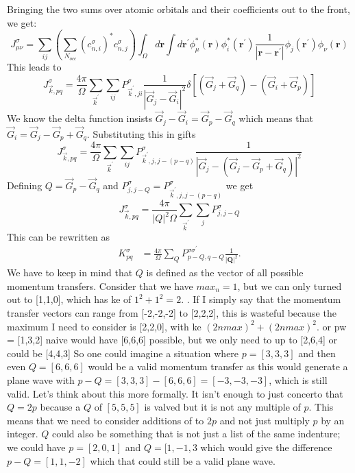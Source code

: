 \documentclass[12pt]{article}
\begin{document}
Bringing the two sums over atomic orbitals and their coefficients out to the front, we get:
\begin{equation}
    J^{\sigma }_{\mu\nu} = \sum_{ij} \left( \sum_{N_{occ}} \left( c^{\sigma }_{n,i} \right)^{*} c^{\sigma }_{n,j} \right) \int_{\Omega } d\mathbf{r} \int d\mathbf{r}^{\prime} \phi^*_\mu(\mathbf{r}) \phi^*_i(\mathbf{r}^{\prime}) \frac{1}{\left|\mathbf{r} - \mathbf{r}^{\prime}\right|} \phi_j(\mathbf{r}^{\prime}) \phi_\nu(\mathbf{r})
\end{equation}
This leads to
\begin{equation}
J_{\vec{k}, p q}^\sigma=\frac{4 \pi}{\Omega} \sum_{\vec{k}^{\prime}} \sum_{i j} P_{\vec{k}^{\prime}, j i}^\sigma \frac{1}{\left|\vec{G}_j-\vec{G}_i\right|^2} \delta\left[\left(\vec{G}_j+\vec{G}_q\right)-\left(\vec{G}_i+\vec{G}_p\right)\right]
\end{equation}
We know the delta function insists $\vec{G}_j-\vec{G}_i = \vec{G}_p - \vec{G}_q$ which means that $\vec{G}_i = \vec{G}_j - \vec{G}_p + \vec{G}_q$. Substituting this in gifts
\begin{equation}
J_{\vec{k}, p q}^\sigma=\frac{4 \pi}{\Omega} \sum_{\vec{k}^{\prime}} \sum_{i j} P_{\vec{k}^{\prime}, j, j - (p-q)}^\sigma \frac{1}{\left|\vec{G}_j-\left( \vec{G}_j - \vec{G}_p + \vec{G}_q \right)\right|^2}
\end{equation}
Defining $Q = \vec{G}_p - \vec{G}_q$ and $P_{j, j-Q}^\sigma = P_{\vec{k}^{\prime}, j, j - (p-q)}^\sigma$ we get
\begin{equation}
J_{\vec{k}, p q}^\sigma=\frac{4 \pi}{|Q|^2\Omega } \sum_{\vec{k}^{\prime}} \sum_{j} P_{j, j-Q}^\sigma
\end{equation}
This can be rewritten as
\begin{equation}
\begin{aligned}
K_{pq}^\sigma & = \frac{4 \pi}{\Omega} \sum_Q P_{p-Q, q-Q}^{\sigma \sigma^{\prime}} \frac{1}{\left|\mathbf{Q}\right|^2} .
\end{aligned}
\end{equation}
We have to keep in mind that $Q$ is defined as the vector of all possible momentum transfers. Consider that we have $max_n = 1$, but we can only turned out to [1,1,0], which has ke of $1^2+1^2 = 2$.
. If I simply say that the momentum transfer vectors can range from [-2,-2,-2] to [2,2,2], this is wasteful because the maximum I need to consider is [2,2,0], with ke $(2nmax)^2 + (2nmax)^2$. or pw = [1,3,2] naive would have [6,6,6] possible, but we only need to up to [2,6,4] or could be [4,4,3]
So one could imagine a situation where $p = [3,3,3]$ and then even $Q = [6,6,6]$ would be a valid momentum transfer as this would generate a plane wave with $p-Q = [3,3,3] - [6,6,6] = [-3,-3,-3]$, which is still valid. Let's think about this more formally. It isn't enough to just concerto that $Q=2p$ because a $Q$ of $[5,5,5]$ is valved but it is not any multiple of $p$. This means that we need to consider additions of to $2p$ and not just multiply $p$ by an integer. $Q$ could also be something that is not just a list of the same indenture; we could have $p = [2,0,1]$ and $Q = [1,-1,3$ which would give the difference $p-Q = [1,1,-2]$ which that could still be a valid plane wave. 
\end{document}
